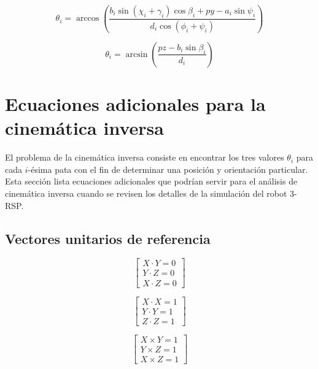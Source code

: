 \documentclass[titlepage, letterpaper, fleqn]{article}
\begin{document}
\begin{equation}
    \label{eq:theta_from_py}
      \theta_i = \arccos \left( \frac{b_i \sin(\chi_i + \gamma_i) \cos\beta_i + py - a_i \sin \psi_i}{d_i\cos(\phi_i + \psi_i)} \right)
\end{equation}

\begin{equation}
    \label{eq:theta_from_pz}
    \theta_i = \arcsin \left(\frac{pz - b_i\sin\beta_i}{d_i}\right)
\end{equation}



\section{Ecuaciones adicionales para la cinemática inversa} %
\label{sec:extra_eqs}

El problema de la cinemática inversa consiste en encontrar los tres valores $\theta_i$ para cada $i$-ésima pata con el fin de determinar una posición y orientación particular.
Esta sección lista ecuaciones adicionales que podrían servir para el análisis de cinemática inversa cuando se revisen los detalles de la simulación del robot 3-RSP.

\subsection{Vectores unitarios de referencia} %
\label{subsec:ref_unit_vectors}

\begin{equation}
    \label{eq:dot_unit_vectors}
    \begin{bmatrix}
    X \cdot Y = 0 \\
    Y \cdot Z = 0 \\
    X \cdot Z = 0
    \end{bmatrix}
\end{equation}

\begin{equation}
    \label{eq:dot_same_unit_vector}
    \begin{bmatrix}
    X \cdot X = 1 \\
    Y \cdot Y = 1 \\
    Z \cdot Z = 1
    \end{bmatrix}
\end{equation}

\begin{equation}
    \label{eq:cross_unit_vectors}
    \begin{bmatrix}
    X \times Y = 1 \\
    Y \times Z = 1 \\
    X \times Z = 1
    \end{bmatrix}
\end{equation}
\end{document}
